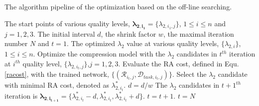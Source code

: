\documentclass[transmag]{IEEEtran}
\begin{document}
\begin{algorithm}[bt]
	\renewcommand{\algorithmicrequire}{\textbf{Input:}}
	\renewcommand{\algorithmicensure}{\textbf{Output:}}
	\caption{The algorithm pipeline of the optimization based on the off-line searching.}
	\label{alg} %
	\begin{algorithmic}
        \REQUIRE The start points of various quality levels, $\bm{\lambda_{2,i_{1}}}=\{\lambda_{2,i_{1},j}\}$, $1\leq i \leq n$ and $j=1,2,3$. The initial interval $d$, the shrink factor $w$, the maximal iteration number $N$ and $t=1$.
        \ENSURE The optimized $\lambda_{2}$ value at various quality levels, $\{\lambda_{2,i}\}$, $1\leq i \leq n$.
        \REPEAT 
        \STATE Optimize the  compression model with the $\lambda_{2}$ candidates in $t^{th}$ iteration at $i^{th}$ quality level, $\{\lambda_{2,i_{t},j}\}$,$j=1,2,3$.
        \STATE Evaluate the RA cost, defined in Equ. \ref{racost}, with the trained network, $\{(\mathcal{R}_{i_{t},j}, \mathcal{D}_{task,i_{t},j})\}$. 
        \STATE Select the $\lambda_{2}$ candidate with minimal RA cost, denoted as $\lambda^{*}_{2,i_{t}}$.
        \STATE $d=d/w$
        \ENDIF 
        \STATE The $\lambda_{2}$ candidates in $t+1^{th}$ iteration is $\bm{\lambda_{2,i_{t+1}}}=\{\lambda_{2,i_{t}}^{*}-d, \lambda_{2,i_{t}}^{*}, \lambda_{2,i_{t}}^{*}+d\}$.
        \STATE $t=t+1$.
        \UNTIL $t=N$
	\end{algorithmic}
\end{algorithm}
\end{document}
